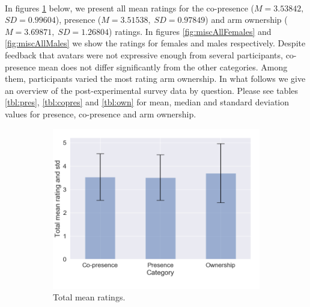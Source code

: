 \\
In figures \ref{fig:miscAll} below, we present all mean ratings for the co-presence ($M=3.53842,\;$ $ SD=0.99604 $), presence ($M=3.51538,\; SD=0.97849 $) and arm ownership ($M=3.69871,\; SD=1.26804 $) ratings. In figures \ref{fig:miscAllFemales} and \ref{fig:miscAllMales} we show the ratings for females and males respectively. Despite feedback that avatars were not expressive enough from several participants, co-presence mean does not differ significantly from the other categories. Among them, participants varied the most rating arm ownership. In what follows we give an overview of the post-experimental survey data by question. Please see tables \ref{tbl:pres}, \ref{tbl:copres} and \ref{tbl:own} for mean, median and standard deviation values for presence, co-presence and arm ownership.
\begin{figure}[H]
 \centering
 \hspace{-25mm}
 \begin{subfigure}[b]{0.5\textwidth}
 \includegraphics[scale=0.45]{Files/Plots/misc_all_mean.png}
 \caption{Total mean ratings.}
\label{fig:miscAll}
\end{subfigure}
 \hspace{20mm}
\begin{subfigure}[b]{0.5\textwidth}
 \centering

\end{subfigure}
\end{figure}
